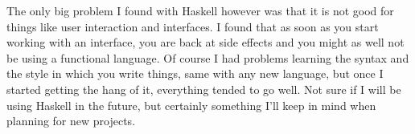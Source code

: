 \documentclass[10point]{article}
\begin{document}
The only big problem I found with Haskell however was that it is not good for things like user interaction and interfaces. I found that as soon as you start working with an  interface, you are back at side effects and you might as well not be using a functional language. Of course I had problems learning the syntax and the style in which you write things, same with any new language, but once I started getting the hang of it, everything tended to go well. Not sure if I will be using Haskell in the future, but certainly something I'll keep in mind when planning for new projects.
\end{document}

